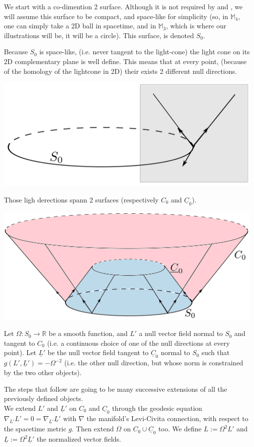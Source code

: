 \documentclass[a4paper,11pt]{article}
\numberwithin{equation}{section}
\theoremstyle{definition}
\begin{document}
We start with a co-dimention 2 surface. Although it is not required by \cite{Chris} and \cite{Art}, we will assume this surface to be compact, and space-like for simplicity (so, in $\mathbb{M}_4$, one can simply take a 2D ball in spacetime, and in $\mathbb{M}_3$, which is where our illustrations will be, it will be a circle). This surface, is denoted $S_0$.

Because $S_0$ is space-like, (i.e. never tangent to the light-cone) the light cone on its 2D complementary plane is well define. This means that at every point, (because of the homology of the lightcone in 2D) their exists 2 different null directions. 
\begin{center}
    \includegraphics [width=0.75\linewidth] {Pictures/00_Start.png}
\end{center}
Those ligh derections spann 2 surfaces (respectively $C_0$ and $\underline{C}_0$).
\begin{center}
    \includegraphics [width=0.75\linewidth] {Pictures/01_Surface.png}
\end{center}

Let $\Omega: S_0 \to \mathbb{R}$ be a smooth function, and $L'$ a null vector field normal to $S_0$ and tangent to $C_0$ (i.e. a continuous choice of one of the null directions at every point). Let $\underline{L}'$ be the null vector field tangent to $\underline{C}_0$ normal to $S_0$ such that $g(L',\underline{L}')=-\Omega^{-2}$ (i.e. the other null direction, but whose norm is constrained by the two other objects).

The steps that follow are going to be many successive extensions of all the previously defined objects.\\
We extend $L'$ and $\underline{L}'$ on $C_0$ and $\underline{C}_0$ through the geodesic equation $\nabla_{L'}L'=0=\nabla_{\underline{L}'}\underline{L}'$ with $\nabla$ the manifold's Levi-Civita connection, with respect to the spacetime metric $g$. Then extend $\Omega$ on $C_0\cup\underline{C}_0$ too. We define $L:=\Omega^2L'$ and $\underline{L} :=\Omega^2 \underline{L}'$ the normalized vector fields.
\end{document}
